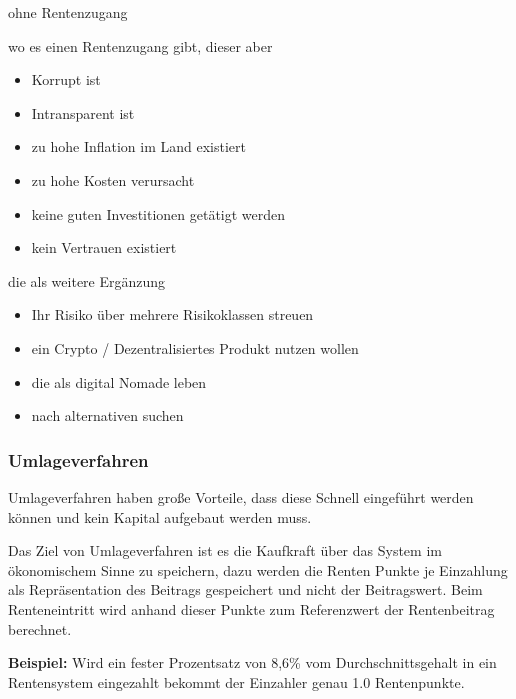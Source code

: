 \begin{compactenum}
\item ohne Rentenzugang
\item wo es einen Rentenzugang gibt, dieser aber 
 \begin{itemize}
 \item Korrupt ist
 \item Intransparent ist
 \item zu hohe Inflation im Land existiert
 \item zu hohe Kosten verursacht
 \item keine guten Investitionen getätigt werden
 \item kein Vertrauen existiert
 \end{itemize}
\item die als weitere Ergänzung 
 \begin{itemize}
 \item Ihr Risiko über mehrere Risikoklassen streuen
 \item ein Crypto / Dezentralisiertes Produkt nutzen wollen
 \item die als digital Nomade leben
 \item nach alternativen suchen
 \end{itemize}
\end{compactenum}

\subsubsection*{Umlageverfahren}


Umlageverfahren haben große Vorteile, dass diese Schnell eingeführt werden können und kein Kapital aufgebaut werden muss.

Das Ziel von Umlageverfahren ist es die Kaufkraft über das System im ökonomischem Sinne zu speichern, dazu werden die Renten Punkte je Einzahlung als Repräsentation des Beitrags gespeichert und nicht der Beitragswert.
Beim Renteneintritt wird anhand dieser Punkte zum Referenzwert der Rentenbeitrag berechnet. 

\textbf{Beispiel:} Wird ein fester Prozentsatz von 8,6\% vom Durchschnittsgehalt in ein Rentensystem eingezahlt bekommt der Einzahler genau 1.0 Rentenpunkte.



